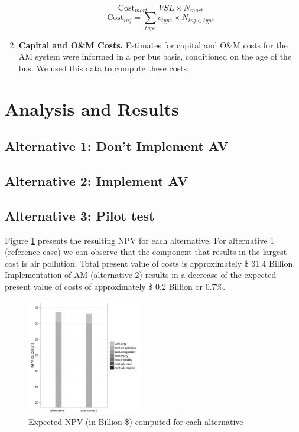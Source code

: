 \documentclass[11pt, letterpaper]{article}
\begin{document}
\begin{enumerate}[leftmargin=*]
  \[\mbox{Cost}_{mort} = VSL \times N_{mort}\]
  \[\mbox{Cost}_{inj} = \sum_{type} c_{type} \times N_{inj \in type} \]
  
\item \textbf{Capital and O\&M Costs.}
  Estimates for capital and O\&M costs for the AM system were informed in a per bus basis, 
  conditioned on the age of the bus. We used this data to compute these costs.
\end{enumerate}

\section{Analysis and Results} \label{results}


\subsection{Alternative 1: Don't Implement AV}

\subsection{Alternative 2: Implement AV}

\subsection{Alternative 3: Pilot test}

Figure \ref{fig:alt1} presents the resulting NPV for each alternative. For alternative 1 (reference case) we can observe that the component that results in the largest cost is air pollution. Total present value of costs is approximately \$ 31.4 Billion. Implementation of AM (alternative 2) results in a decrease of the expected present value of costs of approximately \$ 0.2 Billion or 0.7\%.

\begin{figure}[H]
\begin{center}
\includegraphics[width=0.45\textwidth]{../../R/barplot1}
\caption{Expected NPV (in Billion \$) computed for each alternative}
\label{fig:alt1}
\end{center}
\end{figure}
\end{document}
